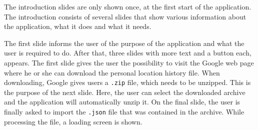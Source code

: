 \documentclass[12p]{article}
\begin{document}
    The introduction slides are only shown once, at the first start of the application. The introduction consists of several slides that show various information about the application, what it does and what it needs.
    
    The first slide informs the user of the purpose of the application and what the user is required to do. After that, three slides with more text and a button each, appears. The first slide gives the user the possibility to visit the Google web page where he or she can download the personal location history file. When downloading, Google gives users a \texttt{.zip} file, which needs to be unzipped. This is the purpose of the next slide. Here, the user can select the downloaded archive and the application will automatically unzip it. On the final slide, the user is finally asked to import the \texttt{.json} file that was contained in the archive. While processing the file, a loading screen is shown.
	
\end{document}
